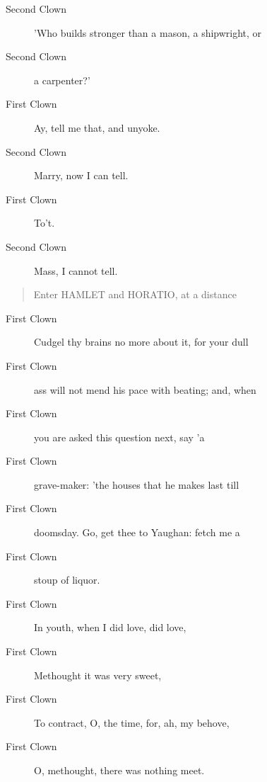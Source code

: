 \documentclass{article}
\begin{document}
\begin{description}
            
\item[Second Clown] 'Who builds stronger than a mason, a shipwright, or
\item[Second Clown] a carpenter?'
\end{description}
          
\begin{description}
            
\item[First Clown] Ay, tell me that, and unyoke.
\end{description}
          
\begin{description}
            
\item[Second Clown] Marry, now I can tell.
\end{description}
          
\begin{description}
            
\item[First Clown] To't.
\end{description}
          
\begin{description}
            
\item[Second Clown] Mass, I cannot tell.
\end{description}
          
\begin{quote}
Enter HAMLET and HORATIO, at a distance
\end{quote}
          
\begin{description}
            
\item[First Clown] Cudgel thy brains no more about it, for your dull
\item[First Clown] ass will not mend his pace with beating; and, when
\item[First Clown] you are asked this question next, say 'a
\item[First Clown] grave-maker: 'the houses that he makes last till
\item[First Clown] doomsday. Go, get thee to Yaughan: fetch me a
\item[First Clown] stoup of liquor.
\item[First Clown] In youth, when I did love, did love,
\item[First Clown] Methought it was very sweet,
\item[First Clown] To contract, O, the time, for, ah, my behove,
\item[First Clown] O, methought, there was nothing meet.
\end{description}
          
\end{document}

